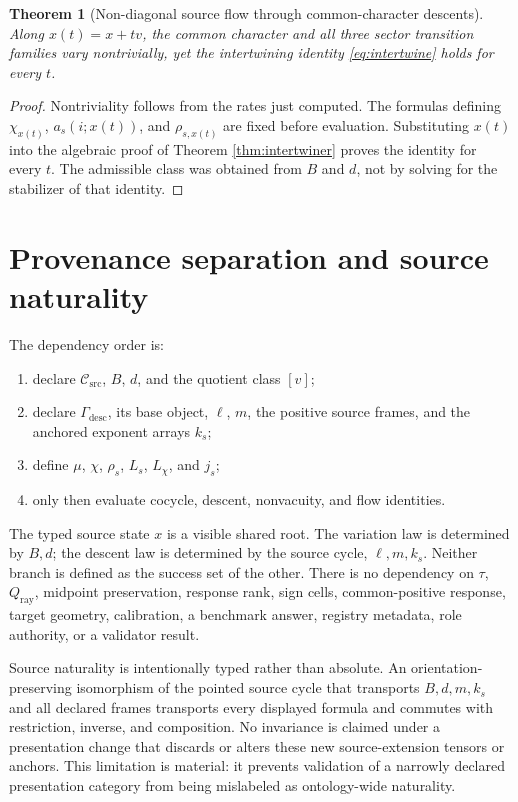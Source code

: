 \documentclass[11pt]{article}
\newtheorem{theorem}{Theorem}
\newcommand{\Csrc}{\mathcal{C}_{\mathrm{src}}}
\newcommand{\Lchi}{L_{\chi}}
\begin{document}
\begin{theorem}[Non-diagonal source flow through common-character descents]
\label{thm:flowdescent}
Along $x(t)=x+tv$, the common character and all three sector transition
families vary nontrivially, yet the intertwining identity
\eqref{eq:intertwine} holds for every $t$.
\end{theorem}

\begin{proof}
Nontriviality follows from the rates just computed.  The formulas defining
$\chi_{x(t)}$, $a_s(i;x(t))$, and $\rho_{s,x(t)}$ are fixed before evaluation.
Substituting $x(t)$ into the algebraic proof of Theorem
\ref{thm:intertwiner} proves the identity for every $t$.  The admissible class
was obtained from $B$ and $d$, not by solving for the stabilizer of that
identity.
\end{proof}

\section{Provenance separation and source naturality}

The dependency order is:
\begin{enumerate}
\item declare $\Csrc$, $B$, $d$, and the quotient class $[v]$;
\item declare $\Gamma_{\mathrm{desc}}$, its base object, $\ell$, $m$, the
      positive source frames, and the anchored exponent arrays $k_s$;
\item define $\mu$, $\chi$, $\rho_s$, $L_s$, $\Lchi$, and $j_s$;
\item only then evaluate cocycle, descent, nonvacuity, and flow identities.
\end{enumerate}

The typed source state $x$ is a visible shared root.  The variation law is
determined by $B,d$; the descent law is determined by the source cycle,
$\ell,m,k_s$.  Neither branch is defined as the success set of the other.
There is no dependency on $\tau$, $Q_{\mathrm{ray}}$, midpoint preservation,
response rank, sign cells, common-positive response, target geometry,
calibration, a benchmark answer, registry metadata, role authority, or a
validator result.

Source naturality is intentionally typed rather than absolute.  An
orientation-preserving isomorphism of the pointed source cycle that transports
$B,d,m,k_s$ and all declared frames transports every displayed formula and
commutes with restriction, inverse, and composition.  No invariance is claimed
under a presentation change that discards or alters these new source-extension
tensors or anchors.  This
limitation is material: it prevents validation of a narrowly declared
presentation category from being mislabeled as ontology-wide naturality.
\end{document}
